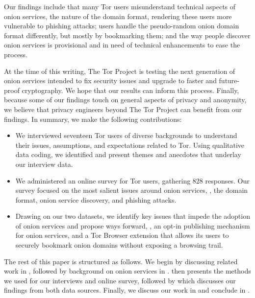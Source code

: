 Our findings include that \first many Tor users misunderstand technical aspects
of onion services, \eg the nature of the domain format, rendering these users
more vulnerable to phishing attacks; \second users handle the pseudo-random
onion domain format differently, but mostly by bookmarking them; and \third the
way people discover onion services is provisional and in need of technical
enhancements to ease the process.

At the time of this writing, The Tor Project is testing the next generation of
onion services intended to fix security issues and upgrade to faster and
future-proof cryptography.  We hope that our results can inform this process.
Finally, because some of our findings touch on general aspects of privacy and
anonymity, we believe that privacy engineers beyond The Tor Project can benefit
from our findings.  In summary, we make the following contributions:

\begin{itemize}
    \item We interviewed seventeen Tor users of diverse backgrounds to
        understand their issues, assumptions, and expectations related to Tor.
        Using qualitative data coding, we identified and present themes and
        anecdotes that underlay our interview data.

    \item We administered an online survey for Tor users, gathering 828
        responses.  Our survey focused on the most salient issues around onion
        services, \ie, the domain format, onion service discovery, and phishing
        attacks.

    \item Drawing on our two datasets, we identify key issues that impede the
        adoption of onion services and propose ways forward, \eg, an opt-in
        publishing mechanism for onion services, and a Tor Browser extension
        that allows its users to securely bookmark onion domains without
        exposing a browsing trail.
\end{itemize}

The rest of this paper is structured as follows.  We begin by discussing related
work in , followed by background on onion services in
.   then presents the methods we used for
our interviews and online survey, followed by  which discusses
our findings from both data sources.  Finally, we discuss our work in
 and conclude in .
